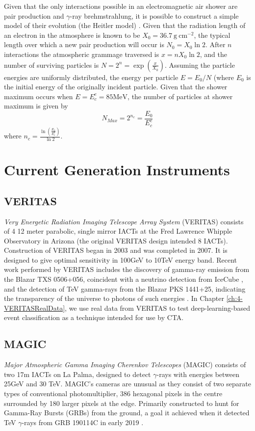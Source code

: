 Given that the only interactions possible in an electromagnetic air shower are pair production and $\gamma$-ray brehmstrahlung, it is possible to construct a simple model of their evolution (the Heitler model) \cite{heitler}. Given that the radiation length of an electron in the atmosphere is known to be $X_0=\mathrm{36.7\ g\ cm^{-2}}$, the typical length over which a new pair production will occur is $N_0=X_0 \ln 2$. After $n$ interactions the atmospheric grammage traversed is $x=nX_0 \ln 2$, and the number of surviving particles is $N=2^n=\exp \left( \frac{x}{X_0}\right)$. Assuming the particle energies are uniformly distributed, the energy per particle $E=E_0/N$ (where $E_0$ is the initial energy of the originally incident particle. Given that the shower maximum occurs when $E=E_c^e=\mathrm{85 MeV}$, the number of particles at shower maximum is given by 
\begin{equation}
    N_{Max}=2^{n_c}=\frac{E_0}{E_c^e}
\end{equation}
where $n_c=\frac{\ln (\frac{E_0}{E_e^c})}{\ln 2}$.
\section{Current Generation Instruments}
\subsection{VERITAS}
\textit{Very Energetic Radiation Imaging Telescope Array System} (VERITAS) consists of 4 12 meter parabolic, single mirror IACTs at the Fred Lawrence Whipple Observatory in Arizona (the original VERITAS design intended 8 IACTs). Construction of VERITAS began in 2003 and was completed in 2007. It is designed to give optimal sensitivity in 100GeV to 10TeV energy band. Recent work performed by VERITAS includes the discovery of gamma-ray emission from the Blazar TXS 0506+056, coincident with a neutrino detection from IceCube \cite{TXS}, and the detection of TeV gamma-rays from the Blazar PKS 1441+25, indicating the transparency of the universe to photons of such energies \cite{escape}. In Chapter \ref{ch:4-VERITASRealData}, we use real data from VERITAS to test deep-learning-based event classification as a technique intended for use by CTA.

\subsection{MAGIC}
\textit{Major Atmospheric Gamma Imaging Cherenkov Telescopes} (MAGIC) consists of two 17m IACTs on La Palma, designed to detect $\gamma$-rays with energies between 25GeV and 30 TeV. MAGIC's cameras are unusual as they consist of two separate types of conventional photomultiplier, 386 hexagonal pixels in the centre surrounded by 180 larger pixels at the edge. Primarily constructed to hunt for Gamma-Ray Bursts (GRBs) from the ground, a goal it achieved when it detected TeV $\gamma$-rays from GRB 190114C in early 2019 \cite{magicGRB}.
